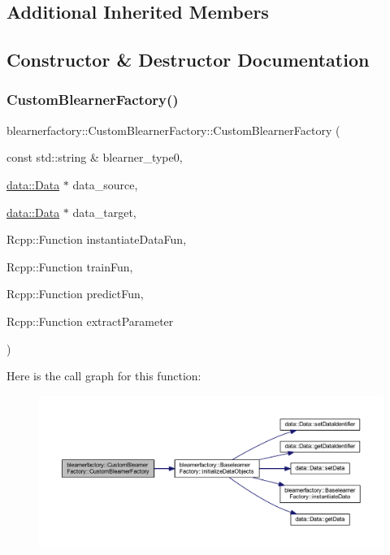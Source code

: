 \subsection*{Additional Inherited Members}


\subsection{Constructor \& Destructor Documentation}
\mbox{\label{classblearnerfactory_1_1_custom_blearner_factory_a1a006cb772dc79cbcbcab810f5431b2c}} 
\subsubsection{\texorpdfstring{Custom\+Blearner\+Factory()}{CustomBlearnerFactory()}}
{\footnotesize\ttfamily blearnerfactory\+::\+Custom\+Blearner\+Factory\+::\+Custom\+Blearner\+Factory (\begin{DoxyParamCaption}\item[{const std\+::string \&}]{blearner\+\_\+type0,  }\item[{\mbox{\hyperlink{classdata_1_1_data}{data\+::\+Data}} $\ast$}]{data\+\_\+source,  }\item[{\mbox{\hyperlink{classdata_1_1_data}{data\+::\+Data}} $\ast$}]{data\+\_\+target,  }\item[{Rcpp\+::\+Function}]{instantiate\+Data\+Fun,  }\item[{Rcpp\+::\+Function}]{train\+Fun,  }\item[{Rcpp\+::\+Function}]{predict\+Fun,  }\item[{Rcpp\+::\+Function}]{extract\+Parameter }\end{DoxyParamCaption})}

Here is the call graph for this function\+:\nopagebreak
\begin{figure}[H]
\begin{center}
\leavevmode
\includegraphics[width=350pt]{classblearnerfactory_1_1_custom_blearner_factory_a1a006cb772dc79cbcbcab810f5431b2c_cgraph}
\end{center}
\end{figure}


